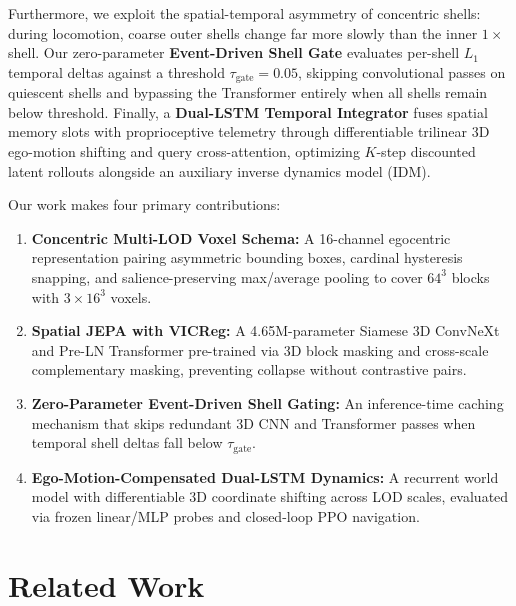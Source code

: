 \documentclass[runningheads]{llncs}
\begin{document}
Furthermore, we exploit the spatial-temporal asymmetry of concentric shells: during locomotion, coarse outer shells change far more slowly than the inner $1\times$ shell. Our zero-parameter \textbf{Event-Driven Shell Gate} evaluates per-shell $L_1$ temporal deltas against a threshold $\tau_{\text{gate}} = 0.05$, skipping convolutional passes on quiescent shells and bypassing the Transformer entirely when all shells remain below threshold. Finally, a \textbf{Dual-LSTM Temporal Integrator} fuses spatial memory slots with proprioceptive telemetry through differentiable trilinear 3D ego-motion shifting and query cross-attention, optimizing $K$-step discounted latent rollouts alongside an auxiliary inverse dynamics model (IDM).

Our work makes four primary contributions:
\begin{enumerate}
    \item \textbf{Concentric Multi-LOD Voxel Schema:} A 16-channel egocentric representation pairing asymmetric bounding boxes, cardinal hysteresis snapping, and salience-preserving max/average pooling to cover $64^3$ blocks with $3\times16^3$ voxels.
    \item \textbf{Spatial JEPA with VICReg:} A 4.65M-parameter Siamese 3D ConvNeXt and Pre-LN Transformer pre-trained via 3D block masking and cross-scale complementary masking, preventing collapse without contrastive pairs.
    \item \textbf{Zero-Parameter Event-Driven Shell Gating:} An inference-time caching mechanism that skips redundant 3D CNN and Transformer passes when temporal shell deltas fall below $\tau_{\text{gate}}$.
    \item \textbf{Ego-Motion-Compensated Dual-LSTM Dynamics:} A recurrent world model with differentiable 3D coordinate shifting across LOD scales, evaluated via frozen linear/MLP probes and closed-loop PPO navigation.
\end{enumerate}

\section{Related Work}
\end{document}
